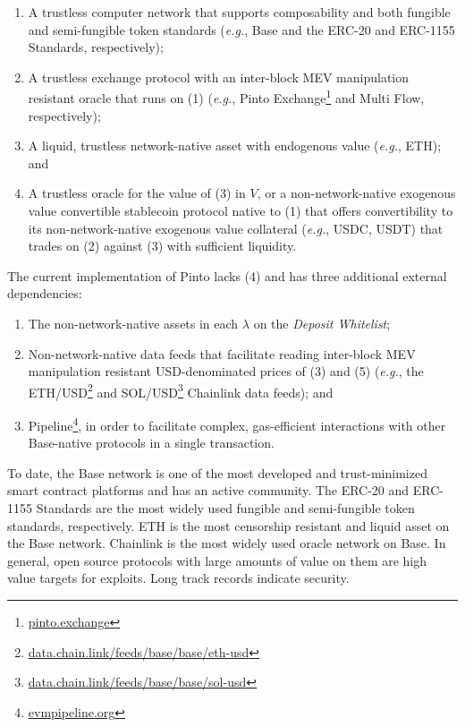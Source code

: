 \documentclass[tikz]{article}
\newcommand{\term}[1]{\textsl{#1}}
\newcommand{\fref}[1]{\footnote{\href{http://#1}{#1}}}
\begin{document}
\begin{enumerate}[label=(\arabic*)]
    \item A trustless computer network that supports composability and both fungible and semi-fungible token standards (\textit{e.g.}, Base and the ERC-20 and ERC-1155 Standards, respectively);
    \item A trustless exchange protocol with an inter-block MEV manipulation resistant oracle that runs on (1) (\textit{e.g.}, Pinto Exchange\fref{pinto.exchange} and Multi Flow, respectively); 
    \item A liquid, trustless network-native asset with endogenous value (\textit{e.g.}, ETH); and
    \item A trustless oracle for the value of (3) in $V$, or a non-network-native exogenous value convertible stablecoin protocol native to (1) that offers convertibility to its non-network-native exogenous value collateral (\textit{e.g.}, USDC, USDT) that trades on (2) against (3) with sufficient liquidity.
\end{enumerate}

The current implementation of Pinto lacks (4) and has three additional external dependencies: 

\begin{enumerate}[label=(\arabic*), start=5]
    \item The non-network-native assets in each $\lambda$ on the \term{Deposit Whitelist};
    \item Non-network-native data feeds that facilitate reading inter-block MEV manipulation resistant USD-denominated prices of (3) and (5) (\textit{e.g.}, the ETH/USD\fref{data.chain.link/feeds/base/base/eth-usd} and SOL/USD\fref{data.chain.link/feeds/base/base/sol-usd} Chainlink data feeds); and 
    \item Pipeline\fref{evmpipeline.org}, in order to facilitate complex, gas-efficient interactions with other Base-native protocols in a single transaction.
\end{enumerate}

To date, the Base network is one of the most developed and trust-minimized smart contract platforms and has an active community. The ERC-20 and ERC-1155 Standards are the most widely used fungible and semi-fungible token standards, respectively. ETH is the most censorship resistant and liquid asset on the Base network. Chainlink is the most widely used oracle network on Base. In general, open source protocols with large amounts of value on them are high value targets for exploits. Long track records indicate security. 
\end{document}
